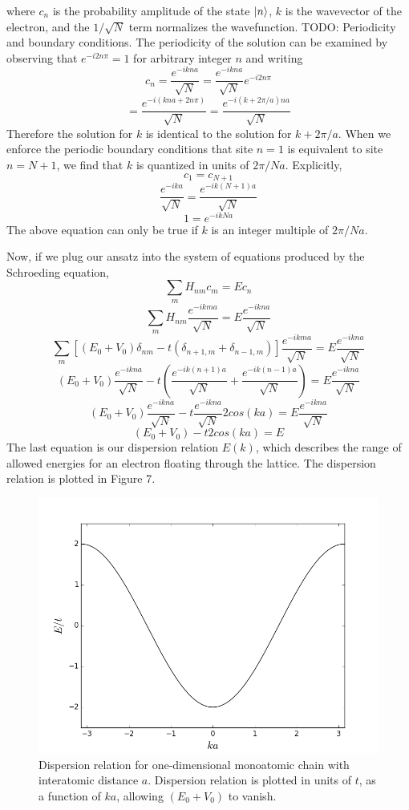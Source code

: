 \documentclass{article}
\begin{document}
where $c_{n}$ is the probability amplitude of the state $\ket{n}$, $k$ is the wavevector of the electron, and the $1/\sqrt{N}$ term normalizes the wavefunction. TODO: Periodicity and boundary conditions.
The periodicity of the solution can be examined by observing that $e^{-i2n\pi} = 1$ for arbitrary integer $n$ and writing
$$ c_{n} = \frac{e^{-ikna}}{\sqrt{N}} = \frac{e^{-ikna}}{\sqrt{N}}e^{-i2n\pi} $$
$$ = \frac{e^{-i(kna + 2n\pi)}}{\sqrt{N}} = \frac{e^{-i(k + 2\pi/a)na}}{\sqrt{N}}$$
Therefore the solution for $k$ is identical to the solution for $k + 2\pi/a$. When we enforce the periodic boundary conditions that site $n = 1$ is equivalent to site $n = N+1$, we find that $k$ is quantized
in units of $2\pi/Na$. Explicitly,
$$c_{1} = c_{N+1}$$
$$ \frac{e^{-ika}}{\sqrt{N}} = \frac{e^{-ik(N+1)a}}{\sqrt{N}}$$
$$ 1 = e^{-ikNa} $$
The above equation can only be true if $k$ is an integer multiple of $2\pi/Na$. \par
Now, if we plug our ansatz into the system of equations produced by the Schroeding equation,
$$ \sum_{m}H_{nm}c_{m} = Ec_{n}$$
$$ \sum_{m}H_{nm}\frac{e^{-ikma}}{\sqrt{N}} = E\frac{e^{-ikna}}{\sqrt{N}}$$
$$ \sum_{m}[(E_{0} + V_{0})\delta_{nm} - t(\delta_{n+1,m} + \delta_{n-1,m})]\frac{e^{-ikma}}{\sqrt{N}} = E\frac{e^{-ikna}}{\sqrt{N}}$$
$$ (E_{0} + V_{0})\frac{e^{-ikna}}{\sqrt{N}} - t\left (\frac{e^{-ik(n+1)a}}{\sqrt{N}} + \frac{e^{-ik(n-1)a}}{\sqrt{N}}\right ) = E\frac{e^{-ikna}}{\sqrt{N}}$$
$$  (E_{0} + V_{0})\frac{e^{-ikna}}{\sqrt{N}} - t\frac{e^{-ikna}}{\sqrt{N}}2cos(ka) = E\frac{e^{-ikna}}{\sqrt{N}} $$
$$ (E_{0} + V_{0}) - t2cos(ka) = E$$
The last equation is our dispersion relation $E(k)$, which describes the range of allowed energies for an electron floating through the lattice. The dispersion relation is plotted in Figure 7.
\begin{figure}[h]
\centering
\includegraphics[scale=.5]{dispersion_1d}
\caption{Dispersion relation for one-dimensional monoatomic chain with interatomic distance $a$. Dispersion relation is plotted in units of $t$, as a function of $ka$, allowing $(E_{0} + V_{0})$ to vanish.}
\end{figure}
\end{document}
